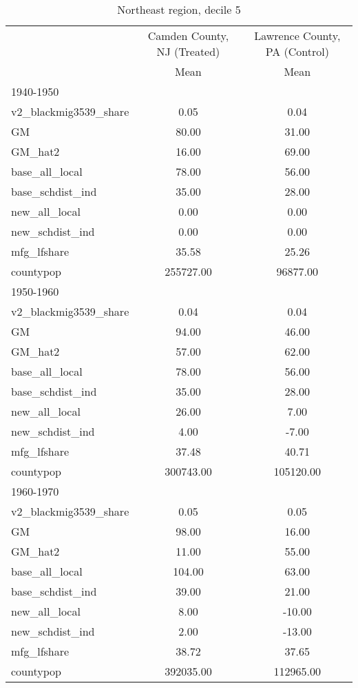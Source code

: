 \begin{table}[htbp]\centering
\def\sym#1{\ifmmode^{#1}\else\(^{#1}\)\fi}
\caption{Northeast region, decile 5 \label{tab1}}
\begin{tabular}{l*{2}{c}}
\toprule
                    &\multicolumn{1}{c}{Camden County, NJ (Treated)}&\multicolumn{1}{c}{Lawrence County, PA (Control)}\\
                    &        Mean&        Mean\\
\midrule
1940-1950           &            &            \\
v2\_blackmig3539\_share&        0.05&        0.04\\
GM                  &       80.00&       31.00\\
GM\_hat2             &       16.00&       69.00\\
base\_all\_local      &       78.00&       56.00\\
base\_schdist\_ind    &       35.00&       28.00\\
new\_all\_local       &        0.00&        0.00\\
new\_schdist\_ind     &        0.00&        0.00\\
mfg\_lfshare         &       35.58&       25.26\\
countypop           &   255727.00&    96877.00\\
\midrule
1950-1960           &            &            \\
v2\_blackmig3539\_share&        0.04&        0.04\\
GM                  &       94.00&       46.00\\
GM\_hat2             &       57.00&       62.00\\
base\_all\_local      &       78.00&       56.00\\
base\_schdist\_ind    &       35.00&       28.00\\
new\_all\_local       &       26.00&        7.00\\
new\_schdist\_ind     &        4.00&       -7.00\\
mfg\_lfshare         &       37.48&       40.71\\
countypop           &   300743.00&   105120.00\\
\midrule
1960-1970           &            &            \\
v2\_blackmig3539\_share&        0.05&        0.05\\
GM                  &       98.00&       16.00\\
GM\_hat2             &       11.00&       55.00\\
base\_all\_local      &      104.00&       63.00\\
base\_schdist\_ind    &       39.00&       21.00\\
new\_all\_local       &        8.00&      -10.00\\
new\_schdist\_ind     &        2.00&      -13.00\\
mfg\_lfshare         &       38.72&       37.65\\
countypop           &   392035.00&   112965.00\\
\bottomrule
\end{tabular}
\end{table}
